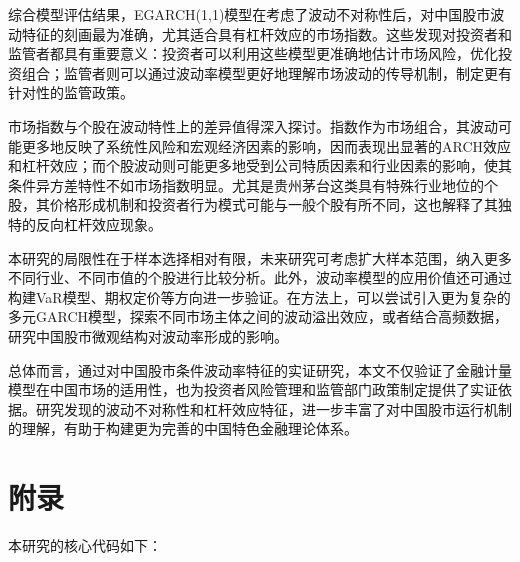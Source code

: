 \documentclass[12pt, a4paper]{article}
\begin{document}
综合模型评估结果，EGARCH(1,1)模型在考虑了波动不对称性后，对中国股市波动特征的刻画最为准确，尤其适合具有杠杆效应的市场指数。这些发现对投资者和监管者都具有重要意义：投资者可以利用这些模型更准确地估计市场风险，优化投资组合；监管者则可以通过波动率模型更好地理解市场波动的传导机制，制定更有针对性的监管政策。

市场指数与个股在波动特性上的差异值得深入探讨。指数作为市场组合，其波动可能更多地反映了系统性风险和宏观经济因素的影响，因而表现出显著的ARCH效应和杠杆效应；而个股波动则可能更多地受到公司特质因素和行业因素的影响，使其条件异方差特性不如市场指数明显。尤其是贵州茅台这类具有特殊行业地位的个股，其价格形成机制和投资者行为模式可能与一般个股有所不同，这也解释了其独特的反向杠杆效应现象。

本研究的局限性在于样本选择相对有限，未来研究可考虑扩大样本范围，纳入更多不同行业、不同市值的个股进行比较分析。此外，波动率模型的应用价值还可通过构建VaR模型、期权定价等方向进一步验证。在方法上，可以尝试引入更为复杂的多元GARCH模型，探索不同市场主体之间的波动溢出效应，或者结合高频数据，研究中国股市微观结构对波动率形成的影响。

总体而言，通过对中国股市条件波动率特征的实证研究，本文不仅验证了金融计量模型在中国市场的适用性，也为投资者风险管理和监管部门政策制定提供了实证依据。研究发现的波动不对称性和杠杆效应特征，进一步丰富了对中国股市运行机制的理解，有助于构建更为完善的中国特色金融理论体系。

\printbibliography[title=参考文献]

\section{附录}

本研究的核心代码如下：
\end{document}
